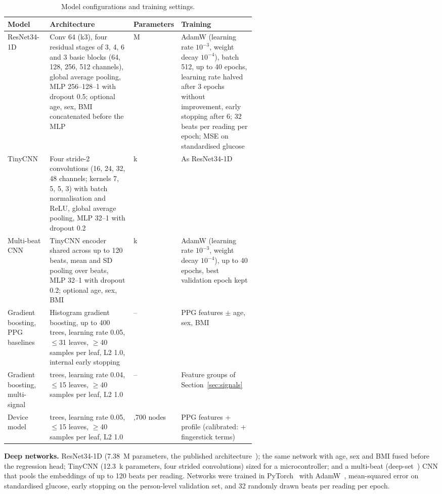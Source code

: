 \documentclass[11pt]{article}
\begin{document}
\begin{table}[!htbp]
\centering\footnotesize\setlength{\tabcolsep}{3.5pt}
\caption{Model configurations and training settings.}
\label{tab:models}
\begin{tabularx}{\linewidth}{@{}>{\RaggedRight}p{0.17\linewidth}>{\RaggedRight}X>{\RaggedRight}p{0.10\linewidth}>{\RaggedRight}p{0.30\linewidth}@{}}
\toprule
Model & Architecture & Parameters & Training \\
\midrule
ResNet34-1D~\citep{zeynali2025,he2016} & Conv 64 (k3), four residual stages of 3, 4, 6 and 3 basic blocks (64, 128, 256, 512 channels), global average pooling, MLP 256--128--1 with dropout 0.5; optional age, sex, BMI concatenated before the MLP & 7.38 M & AdamW (learning rate $10^{-3}$, weight decay $10^{-4}$), batch 512, up to 40 epochs, learning rate halved after 3 epochs without improvement, early stopping after 6; 32 beats per reading per epoch; MSE on standardised glucose \\
TinyCNN & Four stride-2 convolutions (16, 24, 32, 48 channels; kernels 7, 5, 5, 3) with batch normalisation and ReLU, global average pooling, MLP 32--1 with dropout 0.2 & 12.3 k & As ResNet34-1D \\
Multi-beat CNN & TinyCNN encoder shared across up to 120 beats, mean and SD pooling over beats, MLP 32--1 with dropout 0.2; optional age, sex, BMI & 13.9 k & AdamW (learning rate $10^{-3}$, weight decay $10^{-4}$), up to 40 epochs, best validation epoch kept \\
Gradient boosting, PPG baselines & Histogram gradient boosting, up to 400 trees, learning rate 0.05, $\leq$31 leaves, $\geq$40 samples per leaf, L2 1.0, internal early stopping & -- & 17 PPG features $\pm$ age, sex, BMI \\
Gradient boosting, multi-signal & 400 trees, learning rate 0.04, $\leq$15 leaves, $\geq$40 samples per leaf, L2 1.0 & -- & Feature groups of Section~\ref{sec:signals} \\
Device model & 300 trees, learning rate 0.05, $\leq$15 leaves, $\geq$40 samples per leaf, L2 1.0 & 8,700 nodes & 15 PPG features + profile (calibrated: + fingerstick terms) \\
\bottomrule
\end{tabularx}
\end{table}

\textbf{Deep networks.} ResNet34-1D (7.38~M parameters, the published architecture~\citep{zeynali2025,he2016}); the same network with age, sex and BMI fused before the regression head; TinyCNN (12.3~k parameters, four strided convolutions) sized for a microcontroller; and a multi-beat (deep-set~\citep{zaheer2017}) CNN that pools the embeddings of up to 120 beats per reading. Networks were trained in PyTorch~\citep{paszke2019} with AdamW~\citep{loshchilov2019}, mean-squared error on standardised glucose, early stopping on the person-level validation set, and 32 randomly drawn beats per reading per epoch.
\end{document}
